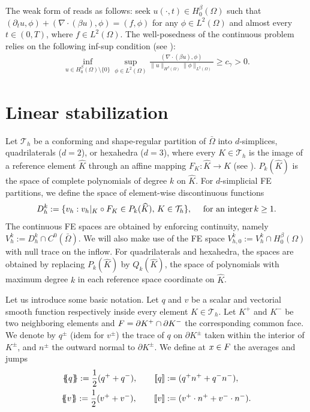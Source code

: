 The weak form of  reads as follows: seek $u(\cdot,t) \in H_0^\beta(\Omega)$ such that $(\partial_t u,\phi) +   (\nabla \cdot (\beta u),\phi) = (f,\phi)$ for any $\phi \in L^2(\Omega)$ and almost every $t \in (0,T)$, where  $f \in L^2(\Omega)$. The well-posedness of the continuous problem relies on the following inf-sup condition (see \cite{guermond_stabilization_1999}):
\begin{align}\label{eq-infsup}
\inf_{u \in H_0^\beta (\Omega)\setminus\{0\}} \sup_{\phi \in L^2(\Omega)} \frac{(\nabla \cdot (\beta u),\phi) }{\|u\|_{H^\beta (\Omega)} \|\phi\|_{L^2(\Omega)}} \geq c_{\gamma} > 0.
\end{align}

\section{Linear stabilization}\label{s-fem}
%
Let $\mathcal{T}_h$ be a conforming and shape-regular partition of $\bar \Omega$ into $d$-simplices, quadrilaterals ($d=2$), or hexahedra ($d=3$), where every $K \in \mathcal{T}_h$ is the image of a reference element $\widehat{K}$ through an affine mapping $F_K: \widehat K \rightarrow K$ (see \cite[Chp. 2]{ciarlet_finite_2002}). %
$P_k(\widehat K)$ is the space of complete polynomials of degree $k$ on $\widehat K$. For $d$-simplicial FE partitions, we define the space of element-wise discontinuous functions
$$
D_{h}^k := \{ v_h: v_h|_K \circ F_K \in P_k(\widehat K), \,{K} \in \mathcal{T}_h\}, \quad \hbox{ for an integer}\, k\geq 1. 
$$
The continuous FE spaces are obtained by enforcing continuity, namely $V_h^k := D_h^k \cap C^0(\bar \Omega)$. We will also make use of the FE space  $V^k_{h,0} := V^k_h \cap H_0^\beta(\Omega)$ with null trace on the inflow. For quadrilaterals and hexahedra, the spaces are obtained by replacing $P_k(\widehat K)$ by $Q_k(\widehat K)$, the space of polynomials with maximum degree $k$ in each reference space coordinate on $\widehat K$.  

Let us introduce some basic notation. Let  $q$ and $v$  be a scalar and vectorial smooth function respectively inside every element $K \in \mathcal{T}_h$. Let $K^+$ and $K^-$ be two neighboring elements and $F = \partial K^+ \cap \partial K^-$ the corresponding common face. We denote by $q^\pm$ (idem for $v^\pm$) the trace of $q$ on $\partial K^\pm$ taken within the interior of $K^\pm$, and $n^\pm$ the outward normal to $\partial K^\pm$. We define at $x \in F$ the averages and jumps 
\begin{align*}
\mean{q} := \half(q^+ + q^-),\qquad \jump{q} &:=(q^+  n^+ + q^- n^-),\\
\mean{v} := \half(v^+ + v^-) ,\qquad \jump{v} &:= (v^+ \cdot n^+ + v^- \cdot n^-).
\end{align*}


